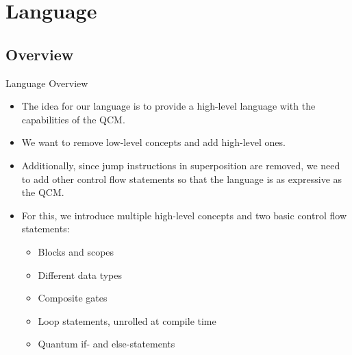 \section{Language}
\subsection{Overview}
\begin{frame}{Language Overview}
    \begin{itemize}
        \item The idea for our language is to provide a high-level language with the capabilities of the QCM. 
        \item We want to remove low-level concepts and add high-level ones.
        \item Additionally, since jump instructions in superposition are removed, we need to add other control flow statements so that the
        language is as expressive as the QCM.
        \item For this, we introduce multiple high-level concepts and two basic control flow statements:
        \begin{itemize}
            \item Blocks and scopes
            \item Different data types
            \item Composite gates
            \item Loop statements, unrolled at compile time
            \item Quantum if- and else-statements
        \end{itemize}
    \end{itemize}
\end{frame}

